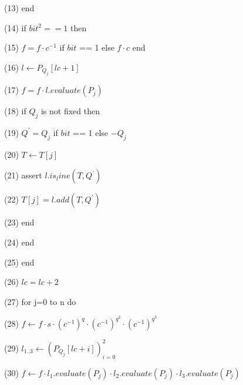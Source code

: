 (13) \indent \indent end \newline

(14) \indent \indent if $bit^2 == 1$ then \newline

(15) \indent \indent \indent $\displaystyle f = f \cdot c^{-1}$ if $bit$ == 1 else $\displaystyle f \cdot c$ end \newline

(16) \indent \indent \indent $\displaystyle l \leftarrow P_{Q_j}[lc+1] $ \newline

(17) \indent \indent \indent $\displaystyle f = f \cdot l.evaluate(P_{j})$ \newline

(18) \indent \indent \indent if $Q_j$ is not fixed then \newline

(19) \indent \indent \indent \indent $\displaystyle Q^{'} = Q_j $ if $bit$ == 1 else $\displaystyle -Q_j $ \newline

(20) \indent \indent \indent $\displaystyle T \leftarrow T[j] $ \newline

(21) \indent \indent \indent assert $\displaystyle l.is_line(T, Q^{'}) $ \newline

(22) \indent \indent \indent $\displaystyle T[j] = l.add(T, Q^{'}) $ \newline

(23) \indent \indent \indent end \newline

(24) \indent \indent end \newline

(25) \indent end \newline

(26) \indent $\displaystyle lc = lc + 2 $ \newline

(27) \indent for j=0 to n do \newline

(28) \indent \indent $\displaystyle f \leftarrow f \cdot s \cdot (c^{-1})^q \cdot (c^{-1})^{q^2} \cdot (c^{-1})^{q^3} $ \newline

(29) \indent \indent $\displaystyle l_{1..3} \leftarrow (P_{Q_j}[lc+i])_{i=0}^2 $ \newline

(30) \indent \indent $\displaystyle f \leftarrow f \cdot l_1.evaluate(P_{j}) \cdot l_2.evaluate(P_{j}) \cdot l_3.evaluate(P_{j}) $ \newline

